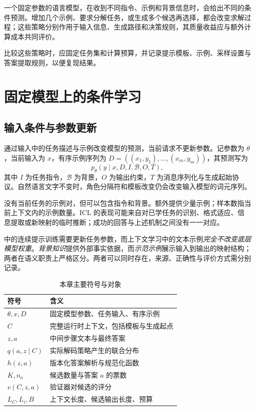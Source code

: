 \documentclass[../textbook.tex]{subfiles}
\begin{document}
\fi
{}

一个固定参数的语言模型，在收到不同指令、示例和背景信息时，会给出不同的条件预测。增加几个示例、要求分解任务，或生成多个候选再选择，都会改变求解过程；这些策略分别作用于输入信息、生成路径和决策规则，其质量收益应与额外计算成本共同评价。

比较这些策略时，应固定任务集和计算预算，并记录提示模板、示例、采样设置与答案提取规则，以便复现结果。

\section{固定模型上的条件学习}

\subsection{输入条件与参数更新}
通过输入中的任务描述与示例改变模型的预测，当前请求不更新参数\cite{brown2020fewshot}。记参数为 $\theta$，当前输入为 $x$，有序示例序列为 $D=((x_1,y_1),\ldots,(x_m,y_m))$，其预测写为
\begin{equation}
p_\theta(y\mid x,D,I,\mathcal B,O,T),
\label{eq:icl-condition}
\end{equation}
其中 $I$ 为任务指令，$\mathcal B$ 为背景，$O$ 为输出约束，$T$ 为消息序列化与生成起始协议。自然语言文字不变时，角色分隔符和模板改变仍会改变输入模型的词元序列。

没有当前任务的示例对，但可以包含指令和背景。额外提供少量示例；样本数指当前上下文内的示例数量。ICL 的表现可能来自对已学任务的识别、格式适应、信息提取或新映射的临时推断；成功的回答与上述机制之间没有一一对应。

中的连续提示训练需要更新任务参数，而上下文学习中的文本示例\emph{完全不改变底层模型权重}。\emph{背景知识}提供外部事实依据，而\emph{示范示例}展示输入到输出的映射结构；两者在语义职责上严格区分。两者可以同时存在，来源、正确性与评价方式需分别记录。

\begin{table}[htbp]
\centering
\caption{本章主要符号与对象}
\label{tab:context-learning-symbols}
\begin{tabular}{ll}
\toprule
符号 & 含义\\
\midrule
$\theta,x,D$ & 固定模型参数、任务输入、有序示例\\
$C$ & 完整运行时上下文，包括模板与生成起点\\
$z,a$ & 中间步骤文本与最终答案\\
$q(a,z\mid C)$ & 实际解码策略产生的联合分布\\
$h(z,a)$ & 版本化答案解析与规范化函数\\
$K,n_a$ & 候选数量与答案 $a$ 的票数\\
$v(C,z,a)$ & 验证器对候选的评分\\
$L_C,L_i,B$ & 上下文长度、候选输出长度、预算\\
\bottomrule
\end{tabular}
\end{table}
\end{document}
